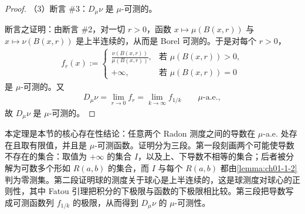 \documentclass[../../main.tex]{subfiles}%
\begin{document}
\begin{proof}
（3）断言 \#3：$D_{\mu}\nu$ 是 $\mu$-可测的。

断言之证明：由断言 \#2，对一切 $r>0$，函数 $x\mapsto\mu(B(x,r))$ 与 $x\mapsto\nu(B(x,r))$ 是上半连续的，从而是 Borel 可测的。于是对每个 $r>0$，
\begin{align*}
f_r(x):=
\begin{cases}
\displaystyle\frac{\nu(B(x,r))}{\mu(B(x,r))}, & \text{若 } \mu(B(x,r))>0,\\[10pt]
+\infty, & \text{若 } \mu(B(x,r))=0
\end{cases}
\end{align*}
是 $\mu$-可测的。又
\begin{align*}
D_{\mu}\nu=\lim_{r\to0}f_r=\lim_{k\to\infty}f_{1/k}\qquad\mu\text{-a.e.},
\end{align*}
故 $D_{\mu}\nu$ 是 $\mu$-可测的。
\end{proof}

\begin{remark}\label{remark:ch01-thm-1-29-动机}
本定理是本节的核心存在性结论：任意两个 Radon 测度之间的导数在 $\mu$-a.e. 处存在且取有限值，并且是 $\mu$-可测函数。证明分为三段。第一段刻画两个可能使导数不存在的集合：取值为 $+\infty$ 的集合 $I$，以及上、下导数不相等的集合；后者被分解为可数多个形如 $R(a,b)$ 的集合，而 $I$ 与每个 $R(a,b)$ 都由\cref{lemma:ch01-1-2}判为零测集。第二段证明球的测度关于球心是上半连续的，这是球测度对球心的正则性，其中 Fatou 引理把积分的下极限与函数的下极限相比较。第三段把导数写成可测函数列 $f_{1/k}$ 的极限，从而得到 $D_{\mu}\nu$ 的 $\mu$-可测性。%
\end{remark}
\end{document}
